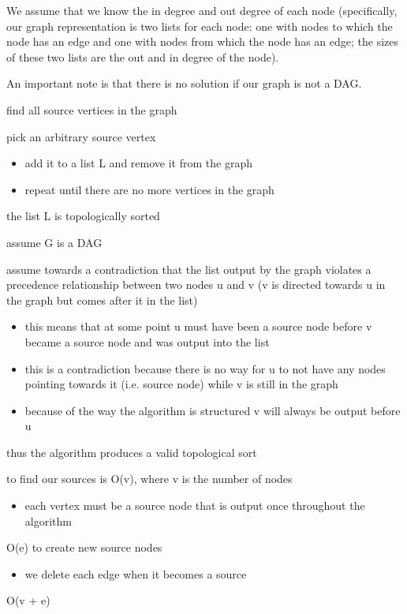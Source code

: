 We assume that we know the in degree and out degree of each node (specifically, our graph representation is two lists for each node: one with nodes to which the node has an edge and one with nodes from which the node has an edge; the sizes of these two lists are the out and in degree of the node).
 
An important note is that there is no solution if our graph is not a DAG.

\algorithm
{
    \item find all source vertices in the graph
    \item pick an arbitrary source vertex
    \begin{itemize}
        \item add it to a list L and remove it from the graph
        \item repeat until there are no more vertices in the graph
    \end{itemize}
    \item the list L is topologically sorted
}
{
    \item assume G is a DAG
    \item assume towards a contradiction that the list output by the graph violates a precedence relationship between two nodes u and v (v is directed towards u in the graph but comes after it in the list)
    \begin{itemize}
        \item this means that at some point u must have been a source node before v became a source node and was output into the list
        \item this is a contradiction because there is no way for u to not have any nodes pointing towards it (i.e. source node) while v is still in the graph
        \item because of the way the algorithm is structured v will always be output before u 
    \end{itemize}
    \item thus the algorithm produces a valid topological sort
}
{
    \item to find our sources is O(v), where v is the number of nodes
    \begin{itemize}
        \item each vertex must be a source node that is output once throughout the algorithm
    \end{itemize}
    \item O(e) to create new source nodes
    \begin{itemize}
        \item we delete each edge when it becomes a source
    \end{itemize}
    \item O(v + e)
}


